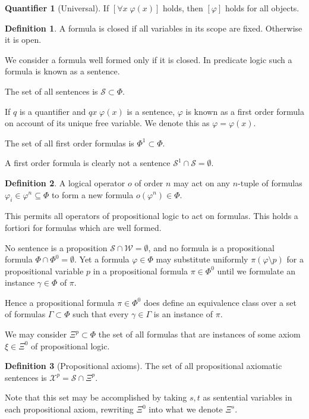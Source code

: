 \documentclass{amsbook}
\newcommand{\wffs}{\mathcal W}
\newcommand{\univ}[1]{\mathord\forall#1\;}
\theoremstyle{definition}
\newtheorem{quant}{Quantifier}[chapter]
\newtheorem{dfn}{Definition}[section]
\begin{document}
\begin{quant}[Universal]
    If $\left[\univ x \varphi(x)\right]$ holds, then $[\varphi]$ holds for all objects.
\end{quant}

\begin{dfn}
    A formula is closed if all variables in its scope are fixed. Otherwise it is open.

    We consider a formula well formed only if it is closed. In predicate logic such a formula is known as a sentence.

    The set of all sentences is $\mathcal S \subset \Phi$.

    If $q$ is a quantifier and $qx\;\varphi(x)$ is a sentence, $\varphi$ is known as a first order formula on account of its unique free variable. We denote this as $\varphi = \varphi(x)$.

    The set of all first order formulas is $\Phi^1 \subset \Phi$.
\end{dfn}

A first order formula is clearly not a sentence $\mathcal S^1 \cap \mathcal S = \emptyset$.

\begin{dfn}
    A logical operator $o$ of order $n$ may act on any $n$-tuple of formulas $\varphi_i \in \varphi^n \subseteq \Phi$ to form a new formula $o(\varphi^n) \in \Phi$.
\end{dfn}

This permits all operators of propositional logic to act on formulas. This holds a fortiori for formulas which are well formed.

No sentence is a proposition $\mathcal S \cap \wffs = \emptyset$, and no formula is a propositional formula $\Phi \cap \Phi^0 = \emptyset$. Yet a formula $\varphi \in \Phi$ may substitute uniformly $\pi(\varphi \setminus p)$ for a propositional variable $p$ in a propositional formula $\pi \in \Phi^0$ until we formulate an instance $\gamma \in \Phi$ of $\pi$.

Hence a propositional formula $\pi \in \Phi^0$ does define an equivalence class over a set of formulas $\varGamma \subset \Phi$ such that every $\gamma \in \varGamma$ is an instance of $\pi$.

We may consider $\Xi^p \subset \Phi$ the set of all formulas that are instances of some axiom $\xi \in \Xi^0$ of propositional logic.

\begin{dfn}[Propositional axioms]
    The set of all propositional axiomatic sentences is $\mathcal X^p = \mathcal S \cap \Xi^p$.

    Note that this set may be accomplished by taking $s, t$ as sentential variables in each propositional axiom, rewriting $\Xi^0$ into what we denote $\Xi^s$.
\end{dfn}
\end{document}
